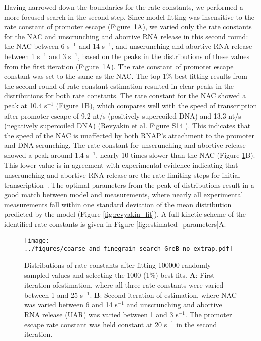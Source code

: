 Having narrowed down the boundaries for the rate constants, we performed a
more focused search in the second step. Since model fitting was insensitive to
the rate constant of promoter escape
(Figure~\ref{fig:parameter_estimation_proper}A), we varied only the rate
constants for the NAC and unscrunching and abortive RNA release in this second
round: the NAC between 6 s$^{-1}$ and 14 s$^{-1}$, and unscrunching and
abortive RNA release between 1 s$^{-1}$ and 3 s$^{-1}$, based on the peaks in
the distributions of these values from the first iteration
(Figure~\ref{fig:parameter_estimation_proper}A). The rate constant of promoter
escape constant was set to the same as the NAC. The top 1\% best fitting
results from the second round of rate constant estimation resulted in clear
peaks in the distributions for both rate constants. The rate constant for the
NAC showed a peak at 10.4 s$^{-1}$ (Figure
\ref{fig:parameter_estimation_proper}B), which compares well with the speed of
transcription after promoter escape of 9.2 nt/s (positively supercoiled DNA)
and 13.3 nt/s (negatively supercoiled DNA) (Revyakin et al.  Figure S14
\cite{revyakin_abortive_2006}). This indicates that the speed of the NAC is
unaffected by both RNAP's attachment to the promoter and DNA scrunching. The
rate constant for unscrunching and abortive release showed a peak around 1.4
s$^{-1}$, nearly 10 times slower than the NAC (Figure
\ref{fig:parameter_estimation_proper}B). This lower value is in agreement with
experimental evidence indicating that unscrunching and abortive RNA release
are the rate limiting steps for initial
transcription~\cite{revyakin_abortive_2006, margeat_direct_2006}. The optimal
parameters from the peak of distributions result in a good match between model
and measurements, where nearly all experimental measurements fall within one
standard deviation of the mean distribution predicted by the model (Figure
\ref{fig:revyakin_fit}). A full kinetic scheme of the identified rate
constants is given in Figure \ref{fig:estimated_parameters}A.

\begin{figure}
	\begin{center}
      \texttt{[image: ../figures/coarse\_and\_finegrain\_search\_GreB\_no\_extrap.pdf]}
	\end{center}
    \caption{Distributions of rate constants after fitting 100000 randomly
      sampled values and selecting the 1000 (1\%) best fits. \textbf{A}: First
      iteration ofestimation, where all three rate constants were varied between 1 and
      25 s$^{-1}$. \textbf{B}: Second iteration of estimation, where NAC was varied
      between 6 and 14 s$^{-1}$ and unscrunching and abortive RNA release
      (UAR) was varied between 1 and 3 s$^{-1}$. The promoter escape rate
      constant was held constant at 20 s$^{-1}$ in the second iteration.}
      \label{fig:parameter_estimation_proper}
\end{figure}


